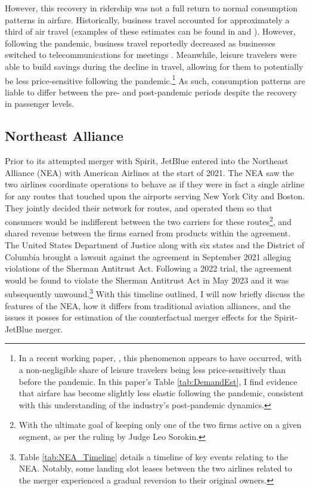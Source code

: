 \documentclass{article}
\begin{document}
	However, this recovery in ridership was not a full return to normal consumption patterns in airfare. Historically, business travel accounted for approximately a third of air travel (examples of these estimates can be found in \citet{berry_tracing_2010} and \citet{bet_market_2021}). However, following the pandemic, business travel reportedly decreased as businesses switched to telecommunications for meetings \citep{semuels_business_2021}. Meanwhile, leisure travelers were able to build savings during the decline in travel, allowing for them to potentially be less price-sensitive following the pandemic.\footnote{In a recent working paper, \citet{ewen_zoom_2023}, this phenomenon appears to have occurred, with a non-negligible share of leisure travelers being less price-sensitively than before the pandemic. In this paper's Table \ref{tab:DemandEst}, I find evidence that airfare has become slightly less elastic following the pandemic, consistent with this understanding of the industry's post-pandemic dynamics.}  As such, consumption patterns are liable to differ between the pre- and post-pandemic periods despite the recovery in passenger levels. 
	
	\subsection{Northeast Alliance}
	\label{sec:Setting_NEA}
	
	Prior to its attempted merger with Spirit, JetBlue entered into the Northeast Alliance (NEA) with American Airlines at the start of 2021. The NEA saw the two airlines coordinate operations to behave as if they were in fact a single airline for any routes that touched upon the airports serving New York City and Boston. They jointly decided their network for routes, and operated them so that consumers would be indifferent between the two carriers for these routes\footnote{With the ultimate goal of keeping only one of the two firms active on a given segment, as per the ruling by Judge Leo Sorokin.}, and shared revenue between the firms earned from products within the agreement. The United States Department of Justice along with six states and the District of Columbia brought a lawsuit against the agreement in September 2021 alleging violations of the Sherman Antitrust Act. Following a 2022 trial, the agreement would be found to violate the Sherman Antitrust Act in May 2023 and it was subsequently unwound\citep{rennison_jetblue-american_2023, rains_what_2023}.\footnote{Table \ref{tab:NEA_Timeline} details a timeline of key events relating to the NEA. Notably, some landing slot leases between the two airlines related to the merger experienced a gradual reversion to their original owners.} With this timeline outlined, I will now briefly discuss the features of the NEA, how it differs from traditional aviation alliances, and the issues it posses for estimation of the counterfactual merger effects for the Spirit-JetBlue merger. 
\end{document}
